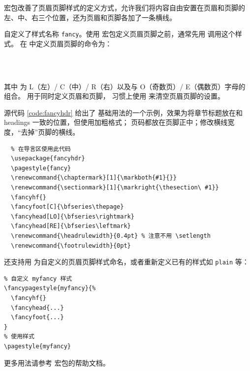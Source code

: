  宏包改善了页眉页脚样式的定义方式，允许我们将内容自由安置在页眉和页脚的左、中、右三个位置，还为页眉和页脚各加了一条横线。

 自定义了样式名称 \texttt{fancy}。使用  宏包定义页眉页脚之前，通常先用  调用这个样式。
在  中定义页眉页脚的命令为：
\begin{command}
\marg*{\ldots}\\
\marg*{\ldots}\\
\marg*{\ldots}
\end{command}
其中  为 L（左）/ C（中）/ R（右）以及与 O（奇数页）/ E（偶数页）字母的组合。 用于同时定义页眉和页脚，
习惯上使用 \marg*{} 来清空页眉页脚的设置。

源代码 \ref{code:fancyhdr} 给出了  基础用法的一个示例，效果为将章节标题放在和 headings 一致的位置，但使用加粗格式；
页码都放在页脚正中；修改横线宽度，“去掉”页脚的横线。

\begin{sourcecode}[htp]
  \begin{Verbatim}
  % 在导言区使用此代码
  \usepackage{fancyhdr}
  \pagestyle{fancy}
  \renewcommand{\chaptermark}[1]{\markboth{#1}{}}
  \renewcommand{\sectionmark}[1]{\markright{\thesection\ #1}}
  \fancyhf{}
  \fancyfoot[C]{\bfseries\thepage}
  \fancyhead[LO]{\bfseries\rightmark}
  \fancyhead[RE]{\bfseries\leftmark}
  \renewcommand{\headrulewidth}{0.4pt} % 注意不用 \setlength
  \renewcommand{\footrulewidth}{0pt}
  \end{Verbatim}
  \caption{ 宏包的使用方法示例。}\label{code:fancyhdr}
\end{sourcecode}

 还支持用  为自定义的页眉页脚样式命名，或者重新定义已有的样式如 \texttt{plain} 等：
\begin{verbatim}
% 自定义 myfancy 样式
\fancypagestyle{myfancy}{%
  \fancyhf{}
  \fancyhead{...}
  \fancyfoot{...}
}
% 使用样式
\pagestyle{myfancy}
\end{verbatim}

更多用法请参考  宏包的帮助文档。

\endinput
